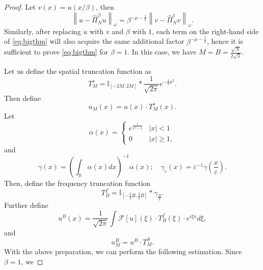 \documentclass[10pt,a4paper]{amsart}
\begin{document}
\begin{proof}
  Let $v(x) = u(x/\beta)$, then
  \begin{equation}\label{eq:0505-2}
    \left\|u-\widehat{\Pi}_N^\beta u\right\|_\omega=\beta^{-\mu-\frac{1}{2}}\left\|v-\widehat{\Pi}_N^1 v\right\|_\omega.
  \end{equation}
  Similarly, after replacing $u$ with $v$ and $\beta$ with $1$, 
  each term on the right-hand side of \eqref{eq:bigthm} 
  will also acquire the same additional factor $\beta^{-\mu-\frac{1}{2}}$,
  hence it is sufficient to prove \eqref{eq:bigthm} for $\beta = 1$.
  In this case, we have $M = B = \frac{\sqrt{N}}{2\sqrt{3}}$.

  Let us define the spatial truncation function as
  \begin{equation}\label{eq:0505-3}
    T_M^s=\mathbb{I}_{[-2 M, 2 M]} * \frac{1}{\sqrt{2 \pi}} e^{-\frac{1}{2} x^2}.
  \end{equation}
  Then define
  \begin{equation}\label{eq:0505-3.5}
    u_M(x) = u(x) \cdot T_M^s(x).
  \end{equation}
  Let
  \begin{equation}\label{eq:0505-4}
    \alpha(x)=\left\{\begin{array}{cc}
    e^{\frac{1}{x^2-1}} & |x|<1 \\
    0 & |x| \geqslant 1,
    \end{array}\right.
  \end{equation}
  and
  \begin{equation}\label{eq:0505-5}
    \gamma(x)=\left(\int_\mathbb{R} \alpha(x) d x\right)^{-1} \alpha(x) ; \quad \gamma_{\varepsilon}(x)=\varepsilon^{-1} \gamma\left(\frac{x}{\varepsilon}\right).
  \end{equation}
  Then, define the frequency truncation function
  \begin{equation}\label{eq:0505-6}
    T_B^f=\mathbb{I}_{\left[-\frac{3}{2} B, \frac{3}{2} B\right]} * \gamma_{\frac{B}{2}}.
  \end{equation}
  Further define
  \begin{equation}\label{eq:0505-7}
    u^B(x)=\frac{1}{\sqrt{2 \pi}} \int \mathcal{F}[u](\xi) \cdot T_B^f(\xi) \cdot e^{i \xi x} d \xi,  
  \end{equation}
  and
  \begin{equation}
  u_M^B=u^B \cdot T_M^S.
  \end{equation}
  With the above preparation, we can perform the following estimation. Since $\beta = 1$, we

\end{proof}
\end{document}
